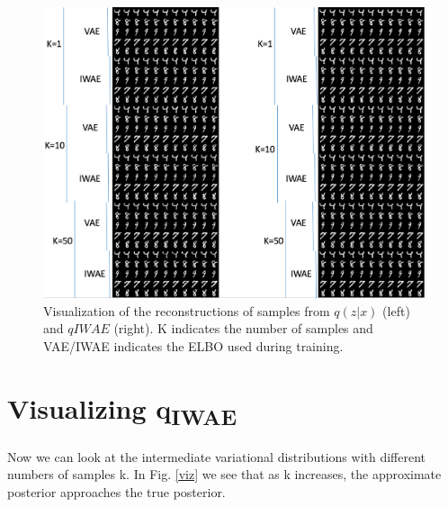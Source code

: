 \documentclass{article}
\begin{document}
\begin{figure}[H]
  \centering
      \includegraphics[width=1.\textwidth]{recons.png}
  \caption{Visualization of the reconstructions of samples from $q(z|x)$ (left) and $qIWAE$ (right). K indicates the number of samples and VAE/IWAE indicates the ELBO used during training. }
  \label{recon}
\end{figure}






\section{Visualizing q\textsubscript{IWAE}}

Now we can look at the intermediate variational distributions with different numbers of samples k. In Fig. \ref{viz} we see that as k increases, the approximate posterior approaches the true posterior. 
\end{document}
